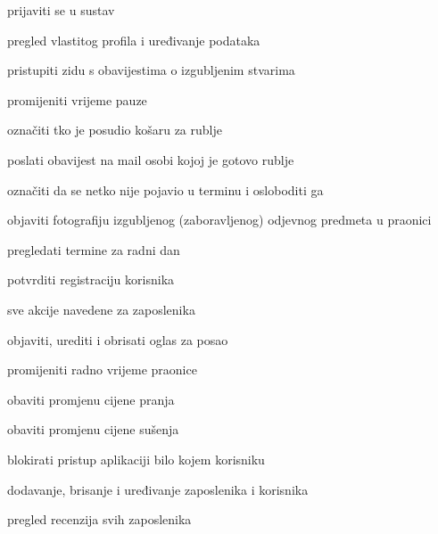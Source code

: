 \begin{packed_enum}
\begin{packed_enum}
	\end{packed_enum}
	
	\item  {}
	
	\begin{packed_enum}
		
		\item prijaviti se u sustav
		\item pregled vlastitog profila i uređivanje podataka
		\item pristupiti zidu s obavijestima o izgubljenim stvarima
		\item promijeniti vrijeme pauze
		\item označiti tko je posudio košaru za rublje
		\item poslati obavijest na mail osobi kojoj je gotovo rublje
		\item označiti da se netko nije pojavio u terminu i osloboditi ga
		\item objaviti fotografiju izgubljenog (zaboravljenog) odjevnog predmeta u praonici
		\item pregledati termine za radni dan
		\item potvrditi registraciju korisnika
		
	\end{packed_enum}
	
	\item  {}
	
	\begin{packed_enum}
		
		\item sve akcije navedene za zaposlenika
		\item objaviti, urediti i obrisati oglas za posao
		\item promijeniti radno vrijeme praonice
		\item obaviti promjenu cijene pranja
		\item obaviti promjenu cijene sušenja
		\item blokirati pristup aplikaciji bilo kojem korisniku
		\item dodavanje, brisanje i uređivanje zaposlenika i korisnika
		\item pregled recenzija svih zaposlenika
		
	\end{packed_enum}
	
	\item  {}
	

\end{packed_enum}
